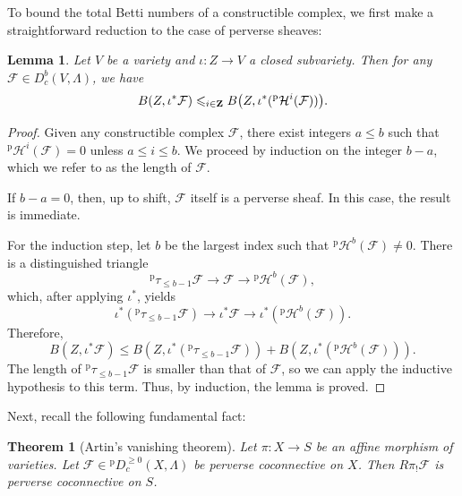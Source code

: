 \documentclass[english]{smfart}
\let\sum\relax\DeclareMathSymbol{\sum}{\mathop}{fourier}{80}
\renewcommand{\mathbb}{\mathbf}
\renewcommand{\leq}{\leqslant}
\renewcommand{\geq}{\geqslant}
\theoremstyle{remark}
\theoremstyle{plain}
\newtheorem{theorem}[remark]{Theorem}
\newtheorem{lemma}[remark]{Lemma}
\theoremstyle{definition}
\numberwithin{equation}{remark}
\theoremstyle{void}
\begin{document}
To bound the total Betti numbers of a constructible complex,
we first make a straightforward reduction to the case of perverse
sheaves:

\begin{lemma}\label{lemma:trivial}
Let \(V\) be a variety and \(\iota \colon Z \to V\) a closed
subvariety.  Then for any \(\mathcal{F} \in D^b_c(V,\Lambda)\),
we have
\[
B(Z, \iota^{\ast}\mathcal{F}) \leq
\sum_{i\in \mathbb{Z}}
B\bigl(Z, \iota^{\ast}({}^{\mathrm{p}}\mathcal{H}^i(\mathcal{F}))\bigr).
\]
\end{lemma}

\begin{proof}
Given any constructible complex \(\mathcal{F}\), there exist integers
\(a \leq b\) such that
\({}^{\mathrm{p}}\mathcal{H}^i(\mathcal{F}) = 0\) unless \(a \leq i \leq b\).
We proceed by induction on the integer \(b-a\), which we refer to as the
length of \(\mathcal{F}\).

If \(b-a = 0\), then, up to shift, \(\mathcal{F}\) itself is a perverse
sheaf.  In this case, the result is immediate.

For the induction step, let \(b\) be the largest index such that
\({}^{\mathrm{p}}\mathcal{H}^b(\mathcal{F}) \neq 0\).
There is a distinguished triangle
\[
{}^{\mathrm{p}}\tau_{\leq b-1} \mathcal{F} \to \mathcal{F} \to {}^{\mathrm{p}}\mathcal{H}^b(\mathcal{F}),
\]
which, after applying \(\iota^{\ast}\), yields
\[
\iota^{\ast}({}^{\mathrm{p}}\tau_{\leq b-1} \mathcal{F}) \to \iota^{\ast} \mathcal{F}
\to \iota^{\ast}({}^{\mathrm{p}}\mathcal{H}^b(\mathcal{F})).
\]
Therefore,
\[
B(Z, \iota^{\ast} \mathcal{F}) \leq
B(Z, \iota^{\ast}({}^{\mathrm{p}}\tau_{\leq b-1} \mathcal{F})) +
B(Z, \iota^{\ast}({}^{\mathrm{p}}\mathcal{H}^b(\mathcal{F}))).
\]
The length of \({}^{\mathrm{p}}\tau_{\leq b-1} \mathcal{F}\) is
smaller than that of \(\mathcal{F}\), so we can apply the inductive
hypothesis to this term.  Thus, by induction, the lemma is proved.
\end{proof}

Next, recall the following fundamental fact:

\begin{theorem}[Artin's vanishing theorem]
\label{theorem:relative-affine-lefschetz}
Let \(\pi\colon X \to S\) be an affine morphism of varieties.
Let \(\mathcal{F} \in {}^{\mathrm{p}}D_c^{\geq 0}(X, \Lambda)\) be perverse
coconnective on \(X\).  Then \(R\pi_{!}\mathcal{F}\) is perverse
coconnective on \(S\).
\end{theorem}
\end{document}
